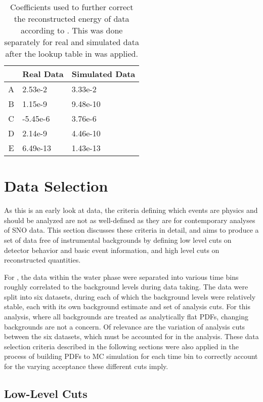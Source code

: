 \begin{table}
\centering
\begin{tabular}{c|l|l}
& Real Data & Simulated Data \\ \hline
A & 2.53e-2 & 3.33e-2 \\ \hline
B & 1.15e-9 & 9.48e-10\\ \hline
C & -5.45e-6 & 3.76e-6\\ \hline
D & 2.14e-9 & 4.46e-10 \\ \hline
E & 6.49e-13 & 1.43e-13
\end{tabular}
\caption{\label{tbl:energy_correction}Coefficients used to further correct the reconstructed energy of {\snop} data according to . This was done separately for real and simulated data after the lookup table in  was applied.}
\end{table}

\section{Data Selection}

As this is an early look at {\snop} data, the criteria defining which events are physics and should be analyzed are not as well-defined as they are for contemporary analyses of SNO data.
This section discusses these criteria in detail, and aims to produce a set of data free of instrumental backgrounds by defining low level cuts on detector behavior and basic event information, and high level cuts on reconstructed quantities.

For {\snop}, the data within the water phase were separated into various time bins roughly correlated to the background levels during data taking.
The data were split into six datasets, during each of which the background levels were relatively stable, each with its  own  background  estimate  and  set  of  analysis cuts.
For this analysis, where all backgrounds are treated as analytically flat PDFs, changing backgrounds are not a concern.
Of relevance are the variation of analysis cuts between the six datasets, which must be accounted for in the analysis.
These data selection criteria described in the following sections were also applied in the process of building PDFs to MC simulation for each time bin to correctly account for the varying acceptance these different cuts imply.

\subsection{Low-Level Cuts}


